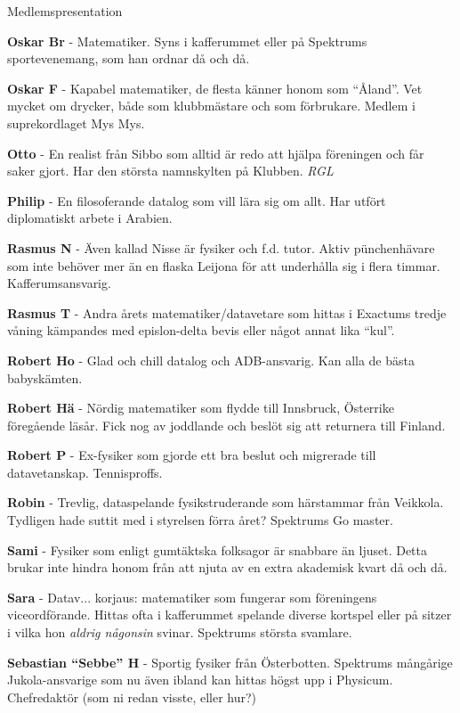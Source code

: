 \documentclass{spektraklet}
\begin{document}
\begin{artikel}{Medlemspresentation}{}
\begin{twocolumns}
\textbf{Oskar Br} - Matematiker. Syns i kafferummet eller på Spektrums sportevenemang, som han ordnar då och då.

\textbf{Oskar F} -  Kapabel matematiker, de flesta känner honom som ``Åland''. Vet mycket om drycker, både som klubbmästare och som förbrukare. Medlem i suprekordlaget Mys Mys.

\textbf{Otto} - En realist från Sibbo som alltid är redo att hjälpa föreningen och får saker gjort. Har den största namnskylten på Klubben. \emph{RGL}

\textbf{Philip} - En filosoferande datalog som vill lära sig om allt. Har utfört diplomatiskt arbete i Arabien. %

\textbf{Rasmus N} - Även kallad Nisse är fysiker och f.d. tutor. Aktiv pünchenhävare som inte behöver mer än en flaska Leijona för att underhålla sig i flera timmar. Kafferumsansvarig.

\textbf{Rasmus T} - Andra årets matematiker/datavetare som hittas i Exactums tredje våning kämpandes med epislon-delta bevis eller något annat lika ``kul''. %

\textbf{Robert Ho} - Glad och chill datalog och ADB-ansvarig. Kan alla de bästa babyskämten.

\textbf{Robert Hä} - Nördig matematiker som flydde till Innsbruck, Österrike föregående läsår. Fick nog av joddlande och beslöt sig att returnera till Finland.

\textbf{Robert P} - Ex-fysiker som gjorde ett bra beslut och migrerade till datavetanskap. Tennisproffs. %

\textbf{Robin} - Trevlig, dataspelande fysikstruderande som härstammar från Veikkola. Tydligen hade suttit med i styrelsen förra året? Spektrums Go master. %

\textbf{Sami} - Fysiker som enligt gumtäktska folksagor är snabbare än ljuset. Detta brukar inte hindra honom från att njuta av en extra akademisk kvart då och då. %

\textbf{Sara} - Datav... korjaus: matematiker som fungerar som föreningens viceordförande. Hittas ofta i kafferummet spelande diverse kortspel eller på sitzer i vilka hon \emph{aldrig någonsin} svinar. Spektrums största svamlare.

\textbf{Sebastian ``Sebbe'' H} - Sportig fysiker från Österbotten. Spektrums mångårige Jukola-ansvarige som nu även ibland kan hittas högst upp i Physicum. Chefredaktör (som ni redan visste, eller hur?)


\end{twocolumns}
\end{artikel}
\end{document}
